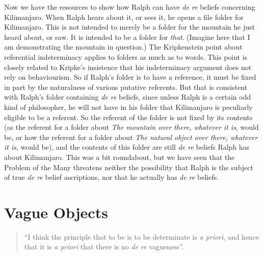 Now we have the resources to show how Ralph can have \textit{de re} beliefs concerning Kilimanjaro. When Ralph hears about it, or sees it, he opens a file folder for Kilimanjaro. This is not intended to merely be a folder for the mountain he just heard about, or saw. It is intended to be a folder for \textit{that}. (Imagine here that I am demonstrating the mountain in question.) The Kripkenstein point about referential indeterminacy applies to folders as much as to words. This point is closely related to Kripke's insistence that his indeterminacy argument does not rely on behaviourism. So if Ralph's folder is to have a reference, it must be fixed in part by the naturalness of various putative referents. But that is consistent with Ralph's folder containing \textit{de re} beliefs, since unless Ralph is a certain odd kind of philosopher, he will not have in his folder that Kilimanjaro is peculiarly eligible to be a referent. So the referent of the folder is not fixed by its contents (as the referent for a folder about \textit{The mountain over there, whatever it is}, would be, or how the referent for a folder about \textit{The natural object over there, whatever it is}, would be), and the contents of this folder are still \textit{de re} beliefs Ralph has about Kilimanjaro. This was a bit roundabout, but we have seen that the Problem of the Many threatens neither the possibility that Ralph is the subject of true \textit{de re} belief ascriptions, nor that he actually has \textit{de re} beliefs.

\section{Vague Objects}

\begin{quote}
``I think the principle that to be is to be determinate is \textit{a priori}, and hence that it is \textit{a priori} that there is no \textit{de re} vagueness''. \cite[657-658]{Jackson2001}
\end{quote}

